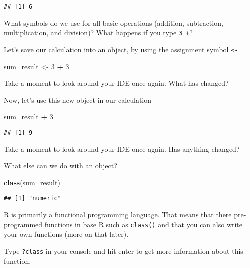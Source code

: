\documentclass[]{book}
\newenvironment{Shaded}{\begin{snugshade}}{\end{snugshade}}
\newcommand{\DecValTok}[1]{\textcolor[rgb]{0.00,0.00,0.81}{#1}}
\newcommand{\KeywordTok}[1]{\textcolor[rgb]{0.13,0.29,0.53}{\textbf{#1}}}
\newcommand{\NormalTok}[1]{#1}
\newcommand{\OperatorTok}[1]{\textcolor[rgb]{0.81,0.36,0.00}{\textbf{#1}}}
\newcommand{\StringTok}[1]{\textcolor[rgb]{0.31,0.60,0.02}{#1}}
\begin{document}
\begin{verbatim}
## [1] 6
\end{verbatim}

\leavevmode\hypertarget{question}{}%
What symbols do we use for all basic operations (addition, subtraction, multiplication, and division)?
What happens if you type \texttt{3\ +}?

Let's save our calculation into an object, by using the assignment symbol \texttt{\textless{}-}.

\begin{Shaded}
\begin{Highlighting}[]
\NormalTok{sum_result <-}\StringTok{ }\DecValTok{3} \OperatorTok{+}\StringTok{ }\DecValTok{3}
\end{Highlighting}
\end{Shaded}

\leavevmode\hypertarget{question}{}%
Take a moment to look around your IDE once again. What has changed?

Now, let's use this new object in our calculation

\begin{Shaded}
\begin{Highlighting}[]
\NormalTok{sum_result }\OperatorTok{+}\StringTok{ }\DecValTok{3}
\end{Highlighting}
\end{Shaded}

\begin{verbatim}
## [1] 9
\end{verbatim}

\leavevmode\hypertarget{question}{}%
Take a moment to look around your IDE once again. Has anything changed?

What else can we do with an object?

\begin{Shaded}
\begin{Highlighting}[]
\KeywordTok{class}\NormalTok{(sum_result)}
\end{Highlighting}
\end{Shaded}

\begin{verbatim}
## [1] "numeric"
\end{verbatim}

R is primarily a functional programming language. That means that there pre-programmed functions in base R such as \texttt{class()} and that you can also write your own functions (more on that later).

Type \texttt{?class} in your console and hit enter to get more information about this function.
\end{document}
